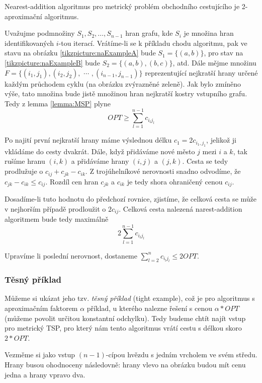 \documentclass[
  printversion=false,
  joinlists=true,
  glossaries=true,
  figures=true,
  tables=true,
  sourcecodes=false,
  theorems=false,
  bibencoding=utf8,
  language=czech,
  encoding=utf8,
  program=infpvs,
  index=true,
  biblatex=true
]{kidiplom}
\begin{document}
\begin{theorem}
Nearest-addition algoritmus pro metrický problém obchodního cestujícího je 2-aproximační algoritmus.
\end{theorem}

\proof
Uvažujme podmnožiny $S_1, S_2,…,S_{n-1}$ hran grafu, kde $S_i$ je množina hran identifikovaných $i$-tou iterací. Vrátíme-li se k příkladu chodu algoritmu, pak ve stavu na obrázku \ref{tikzpicture:naExampleA} bude $S_1 = \{(a, b)\}$, pro stav na \ref{tikzpicture:naExampleB} bude $S_2 = \{(a, b), (b, c)\}$, atd. Dále mějme množinu $F = \{(i_1, j_1), (i_2, j_2), $ $\cdots$ $,(i_{n-1}, j_{n-1})\}$ reprezentující nejkratší hrany určené každým průchodem cyklu (na obrázku zvýrazněné zeleně). Jak bylo zmíněno výše, tato množina bude jistě množinou hran nejkratší kostry vstupního grafu. Tedy z lemma \ref{lemma:MSP} plyne
$$
OPT \ge\sum_{l = 1}^{n-1} c_{i_l j_l}
$$

Po najití první nejkratší hrany máme výslednou délku $c_1 = 2c_{i_1, j_1}$, jelikož ji vkládáme do cesty dvakrát. Dále, když přidáváme nové město $j$ mezi $i$ a $k$, tak rušíme hranu $(i, k)$ a přidáváme hrany $(i, j)$ a $(j, k)$. Cesta se tedy prodlužuje o $c_{ij} + c_{jk} - c_{ik}$. Z trojúhelníkové nerovnosti snadno odvodíme, že $c_{jk} - c_{ik} \le c_{ij}$. Rozdíl cen hran $c_{jk}$ a $c_{ik}$ je tedy shora ohraničený cenou $c_{ij}$.

Dosadíme-li tuto hodnotu do předchozí rovnice, zjistíme, že celková cesta se může v nejhorším případě prodloužit o $2c_{ij}$. Celková cesta nalezená narest-addition algoritmem bude tedy maximálně $$2\sum_{l=1}^{n-1}c_{i_l j_l}$$

Upravíme li poslední nerovnost, dostaneme $\sum_{l=2}^{n}c_{i_l j_l} \le 2OPT$.

\subsubsection{Těsný příklad} \label{tightExample:NA}

Můžeme si ukázat jeho tzv. \textit{těsný příklad} (tight example), což je pro algoritmus s aproximačním faktorem $\alpha$ příklad, u kterého nalezne řešení s cenou $\alpha * OPT$ (můžeme povolit určitou konstantní odchylku). Tedy budeme chtít najít vstup  pro metrický TSP, pro který nám tento algoritmus vrátí cestu s délkou skoro $2 * OPT$.

Vezměme si jako vstup $(n - 1)$-cípou hvězdu s jedním vrcholem ve svém středu. Hrany busou ohodnoceny následovně: hrany vlevo na obrázku budou mít cenu jedna a hrany vpravo dva.
\end{document}
